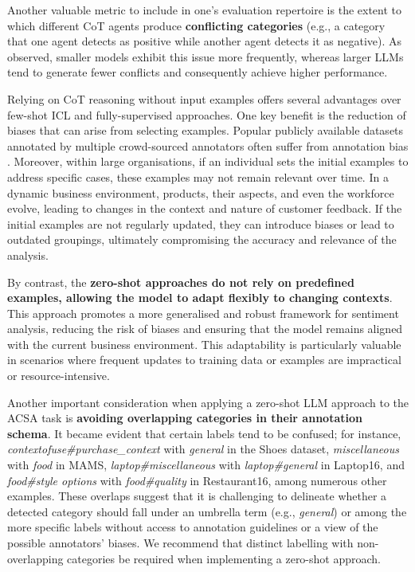 \documentclass[11pt]{article}
\begin{document}
Another valuable metric to include in one’s evaluation repertoire is the extent to which different CoT agents produce \textbf{conflicting categories} (e.g., a category that one agent detects as positive while another agent detects it as negative). As observed, smaller models exhibit this issue more frequently, whereas larger LLMs tend to generate fewer conflicts and consequently achieve higher performance.

Relying on CoT reasoning without input examples offers several advantages over few-shot ICL and fully-supervised approaches. One key benefit is the reduction of biases that can arise from selecting examples. Popular publicly available datasets annotated by multiple crowd-sourced annotators often suffer from annotation bias \citep{geva-etal-2019-modeling,gururangan-etal-2018-annotation,PAULLADA2021100336}. Moreover, within large organisations, if an individual sets the initial examples to address specific cases, these examples may not remain relevant over time. In a dynamic business environment, products, their aspects, and even the workforce evolve, leading to changes in the context and nature of customer feedback. If the initial examples are not regularly updated, they can introduce biases or lead to outdated groupings, ultimately compromising the accuracy and relevance of the analysis.

By contrast, the \textbf{zero-shot approaches do not rely on predefined examples, allowing the model to adapt flexibly to changing contexts}. This approach promotes a more generalised and robust framework for sentiment analysis, reducing the risk of biases and ensuring that the model remains aligned with the current business environment. This adaptability is particularly valuable in scenarios where frequent updates to training data or examples are impractical or resource-intensive.

Another important consideration when applying a zero-shot LLM approach to the ACSA task is \textbf{avoiding overlapping categories in their annotation schema}. It became evident that certain labels tend to be confused; for instance, \textit{contextofuse\#purchase\_context} with \textit{general} in the Shoes dataset, \textit{miscellaneous} with \textit{food} in MAMS, \textit{laptop\#miscellaneous} with \textit{laptop\#general} in Laptop16, and \textit{food\#style options} with \textit{food\#quality} in Restaurant16, among numerous other examples. These overlaps suggest that it is challenging to delineate whether a detected category should fall under an umbrella term (e.g., \textit{general}) or among the more specific labels without access to annotation guidelines or a view of the possible annotators' biases. We recommend that distinct labelling with non-overlapping categories be required when implementing a zero-shot approach.
\end{document}
